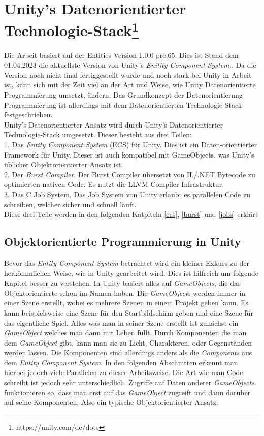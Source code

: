 \documentclass[12pt, titlepage]{article}
\DeclareRobustCommand{\#}{\adjustbox{valign=B,totalheight=.57\baselineskip}{\oldhash}}%
\begin{document}
\section{Unity's Datenorientierter Technologie-Stack\footnote{https://unity.com/de/dots}}
Die Arbeit basiert auf der Entities Version 1.0.0-pre.65. Dies ist Stand dem 01.04.2023 die aktuellste Version von Unity's \textit{Enitity Component System.}. Da die Version noch nicht final fertiggestellt wurde und noch stark bei Unity in Arbeit ist, kann sich mit der Zeit viel an der Art und Weise, wie Unity Datenorientierte Programmierung umsetzt, ändern. Das Grundkonzept der Datenorientierung Programmierung ist allerdings mit dem Datenorientierten Technologie-Stack festgeschrieben.\\
Unity's Datenorientierter Ansatz wird durch Unity's Datenorientierter Technologie-Stack umgesetzt. Dieser besteht aus drei Teilen:\\
1. Das \textit{Entity Component System} (ECS) für Unity. Dies ist ein Daten-orientierter Framework für Unity. Dieser ist auch kompatibel mit GameObjects, was Unity's üblicher Objektorientierter Ansatz ist.\\
2. Der \textit{Burst Compiler}. Der Burst Compiler übersetzt von IL/.NET Bytecode zu optimierten nativen Code. Es nutzt die LLVM Compiler Infrastruktur.\\
3. Das C\# Job System. Das Job System von Unity erlaubt es parallelen Code zu schreiben, welcher sicher und schnell läuft.\\
Diese drei Teile werden in den folgenden Katpiteln \ref{ecs}, \ref{burst} und \ref{jobs} erklärt
\subsection{Objektorientierte Programmierung in Unity}
Bevor das \textit{Entity Component System} betrachtet wird ein kleiner Exkurs zu der herkömmlichen Weise, wie in Unity gearbeitet wird. Dies ist hilfreich um folgende Kapitel besser zu verstehen. In Unity basiert alles auf \textit{GameObjects}, die das Objektorientierte schon im Namen haben. Die \textit{GameObjects} werden immer in einer Szene erstellt, wobei es mehrere Szenen in einem Projekt geben kann. Es kann beispielsweise eine Szene für den Startbildschirm geben und eine Szene für das eigentliche Spiel. Alles was man in seiner Szene erstellt ist zunächst ein \textit{GameObject} welches man dann mit Leben füllt. Durch Komponenten die man dem \textit{GameObject} gibt, kann man sie zu Licht, Charakteren, oder Gegenständen werden lassen. Die Komponenten sind allerdings anders als die \textit{Components} aus dem \textit{Entity Component System}. In den folgenden Abschnitten erkennt man hierbei jedoch viele Parallelen zu dieser Arbeitsweise. Die Art wie man Code schreibt ist jedoch sehr unterschiedlich. Zugriffe auf Daten anderer \textit{GameObjects} funktionieren so, dass man erst auf das \textit{GameObject} zugreift und dann darüber auf seine Komponenten. Also ein typische Objektorientierter Ansatz.
\end{document}
